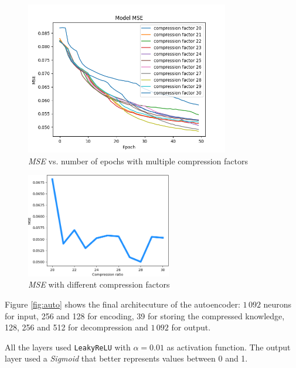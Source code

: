\documentclass[compsoc]{IEEEtran}
\begin{document}
\begin{figure}[ht!]
\centering                                                                        
\includegraphics[width=3.5in]{multiacc.png}
\captionsetup{justification=centering}                                                                                         
\caption{\emph{MSE} vs. number of epochs with multiple compression factors}
\label{fig:multiacc}
\end{figure}

\begin{figure}[ht!]
\centering                                                                        
\includegraphics[width=2.5in]{mse.png}
\captionsetup{justification=centering}                                                                                                                              
\caption{\emph{MSE} with different compression factors}
\label{fig:mse}                                                                                                                                         
\end{figure}


Figure \ref{fig:auto} shows the final architecuture of the autoencoder: $1\,092$ neurons for input, 256 and 128 for encoding, 39 for storing the compressed knowledge, 128, 256 and 512 for decompression and $1\,092$ for output.\par
All the layers used \texttt{LeakyReLU} with $\alpha=0.01$ as activation function. The output layer used a \emph{Sigmoid} that better represents values between 0 and 1.
\end{document}

